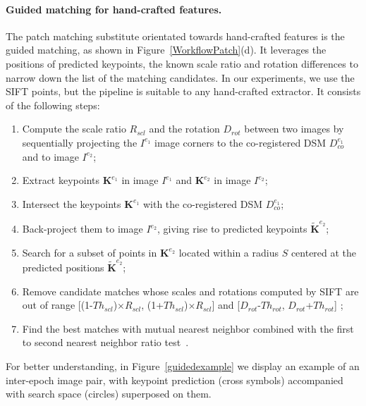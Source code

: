 \paragraph{Guided matching for hand-crafted features.} 
The patch matching substitute orientated towards hand-crafted features is the guided matching, as shown in Figure~\ref{WorkflowPatch}(d). It leverages the positions of predicted keypoints, {the known scale ratio and rotation differences to narrow down the list of the matching candidates}. In our experiments, we use the SIFT points, but the pipeline is suitable to any hand-crafted extractor. 
It consists of the following steps:\\
\begin{enumerate}
	\item {Compute the scale ratio $R_{scl}$ and the rotation $D_{rot}$ between two images by sequentially projecting the $I^{e_1}$ image corners to the co-registered \ac{DSM} $D_{co}^{e_1}$ and to image $I^{e_2}$;} %
	\item Extract keypoints $\mathbf{K}^{e_1}$ in image $I^{e_1}$ and $\mathbf{K}^{e_2}$ in image $I^{e_2}$;
	\item Intersect the keypoints $\mathbf{K}^{e_1}$ with the co-registered \ac{DSM} $D_{co}^{e_1}$;
	\item Back-project them to image $I^{e_2}$, giving rise to predicted keypoints $\widetilde{\mathbf{K}}^{e_2}$;
	\item Search for a subset of points in $\mathbf{K}^{e_2}$ located within a radius $S$ centered at the predicted positions $\widetilde{\mathbf{K}}^{e_2}$;%
	\item Remove candidate matches whose scales and rotations computed by SIFT are out of range [(1-$Th_{scl}$)$\times$$R_{scl}$, (1+$Th_{scl}$)$\times$$R_{scl}$] and [$D_{rot}$-$Th_{rot}$, $D_{rot}$+$Th_{rot}$] ;%
	\item {Find the best matches with mutual nearest neighbor combined with the first to second nearest neighbor ratio test~\cite{lowe2004distinctive}.}
\end{enumerate}
For better understanding, in Figure~\ref{guidedexample} we display an example of an inter-epoch image pair, with keypoint prediction (cross symbols) accompanied with search space (circles) superposed on them.\\

